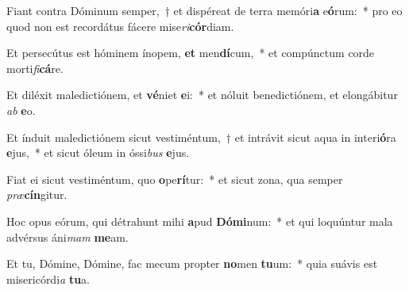 \item Fiant contra Dóminum semper,~† et dispéreat de terra memóri\textbf{a} e\textbf{ó}rum:~* pro eo quod non est recordátus fácere mise\textit{ri}\textbf{cór}diam.
\item Et persecútus est hóminem ínopem, \textbf{et} men\textbf{dí}cum,~* et compúnctum corde morti\textit{fi}\textbf{cá}re.
\item Et diléxit maledictiónem, et \textbf{vé}niet \textbf{e}i:~* et nóluit benedictiónem, et elongábitur \textit{ab} \textbf{e}o.
\item Et índuit maledictiónem sicut vestiméntum,~† et intrávit sicut aqua in interi\textbf{ó}ra \textbf{e}jus,~* et sicut óleum in óssi\textit{bus} \textbf{e}jus.
\item Fiat ei sicut vestiméntum, quo \textbf{o}pe\textbf{rí}tur:~* et sicut zona, qua semper \textit{præ}\textbf{cín}gitur.
\item Hoc opus eórum, qui détrahunt mihi \textbf{a}pud \textbf{Dó}\textbf{mi}num:~* et qui loquúntur mala advérsus áni\textit{mam} \textbf{me}am.
\item Et tu, Dómine, Dómine, fac mecum propter \textbf{no}men \textbf{tu}um:~* quia suávis est misericórdi\textit{a} \textbf{tu}a.

